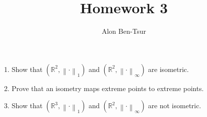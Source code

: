 \documentclass[11pt]{article} %
\title{Homework 3}
\author{Alon Ben-Tsur}
\newcommand{\norm}[1]{\left\lVert#1\right\rVert}
\begin{document}
\maketitle

\begin{Exercise}
\begin{enumerate}
\item Show that $\left(\mathbb{R}^2, \norm{\cdot}_1 \right)$ and $\left(\mathbb{R}^2, \norm{\cdot}_\infty \right)$ are isometric.
\item Prove that an isometry maps extreme points to extreme points.
\item Show that $\left(\mathbb{R}^3, \norm{\cdot}_1 \right)$ and $\left(\mathbb{R}^2, \norm{\cdot}_\infty \right)$ are not isometric.
\end{enumerate}
\end{Exercise}
\end{document}
